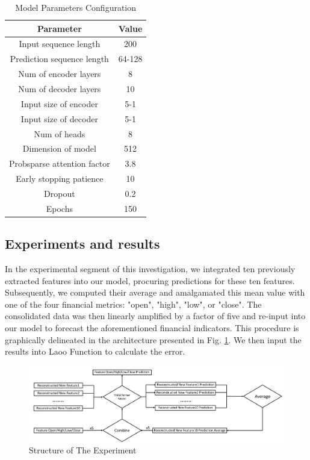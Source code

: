 \documentclass[sn-mathphys,Numbered]{sn-jnl}
\theoremstyle{thmstyleone}%
\theoremstyle{thmstyletwo}%
\theoremstyle{thmstylethree}%
\begin{document}
\begin{table}[h]
\caption{Model Parameters Configuration}\label{tab_parameters}%
\centering
\begin{tabular}{@{}cc@{}}
\toprule
\textbf{Parameter} & \textbf{Value} \\
\midrule
Input sequence length & 200 \\
Prediction sequence length & 64-128 \\
Num of encoder layers & 8 \\
Num of decoder layers & 10 \\
Input size of encoder & 5-1 \\
Input size of decoder & 5-1 \\
Num of heads & 8 \\
Dimension of model & 512 \\
Probsparse attention factor & 3.8 \\
Early stopping patience & 10 \\
Dropout & 0.2 \\
Epochs & 150 \\
\bottomrule
\end{tabular}
\end{table}


\subsection{Experiments and results}\label{subsubsec1}
In the experimental segment of this investigation, we integrated ten previously extracted features into our model, procuring predictions for these ten features. Subsequently, we computed their average and amalgamated this mean value with one of the four financial metrics: "open", "high", "low", or "close". The consolidated data was then linearly amplified by a factor of five and re-input into our model to forecast the aforementioned financial indicators. This procedure is graphically delineated in the architecture presented in Fig. \ref{arche}. We then input the results into Laoo Function to calculate the error.

\begin{figure}[h]
    \centering
    \includegraphics[width=1\textwidth]{pngs/arche.png}
    \caption{Structure of The Experiment}
    \label{arche}
\end{figure}
\end{document}
